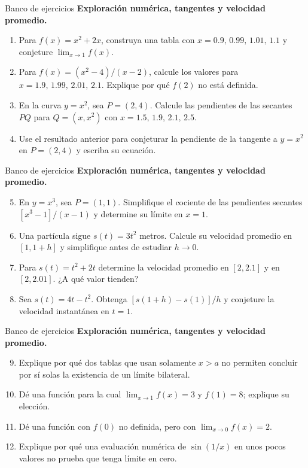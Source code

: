 \documentclass[12pt,aspectratio=169]{beamer}
\begin{document}
\begin{frame}[t,allowframebreaks]{Banco de ejercicios}
\small
\noindent \textbf{Exploración numérica, tangentes y velocidad promedio.}\par\smallskip
\begin{enumerate}\setcounter{enumi}{0}
\item Para $f(x)=x^2+2x$, construya una tabla con $x=0.9,\,0.99,\,1.01,\,1.1$ y conjeture $\lim_{x\to1}f(x)$.
\item Para $f(x)=(x^2-4)/(x-2)$, calcule los valores para $x=1.9,\,1.99,\,2.01,\,2.1$. Explique por qué $f(2)$ no está definida.
\item En la curva $y=x^2$, sea $P=(2,4)$. Calcule las pendientes de las secantes $PQ$ para $Q=(x,x^2)$ con $x=1.5,\,1.9,\,2.1,\,2.5$.
\item Use el resultado anterior para conjeturar la pendiente de la tangente a $y=x^2$ en $P=(2,4)$ y escriba su ecuación.
\end{enumerate}
\end{frame}


\begin{frame}[t,allowframebreaks]{Banco de ejercicios}
\small
\noindent \textbf{Exploración numérica, tangentes y velocidad promedio.}\par\smallskip
\begin{enumerate}\setcounter{enumi}{4}
\item En $y=x^3$, sea $P=(1,1)$. Simplifique el cociente de las pendientes secantes $[x^3-1]/(x-1)$ y determine su límite en $x=1$.
\item Una partícula sigue $s(t)=3t^2$ metros. Calcule su velocidad promedio en $[1,1+h]$ y simplifique antes de estudiar $h\to0$.
\item Para $s(t)=t^2+2t$ determine la velocidad promedio en $[2,2.1]$ y en $[2,2.01]$. ¿A qué valor tienden?
\item Sea $s(t)=4t-t^2$. Obtenga $[s(1+h)-s(1)]/h$ y conjeture la velocidad instantánea en $t=1$.
\end{enumerate}
\end{frame}


\begin{frame}[t,allowframebreaks]{Banco de ejercicios}
\small
\noindent \textbf{Exploración numérica, tangentes y velocidad promedio.}\par\smallskip
\begin{enumerate}\setcounter{enumi}{8}
\item Explique por qué dos tablas que usan solamente $x> a$ no permiten concluir por sí solas la existencia de un límite bilateral.
\item Dé una función para la cual $\lim_{x\to1}f(x)=3$ y $f(1)=8$; explique su elección.
\item Dé una función con $f(0)$ no definida, pero con $\lim_{x\to0}f(x)=2$.
\item Explique por qué una evaluación numérica de $\sin(1/x)$ en unos pocos valores no prueba que tenga límite en cero.
\end{enumerate}
\end{frame}
\end{document}
